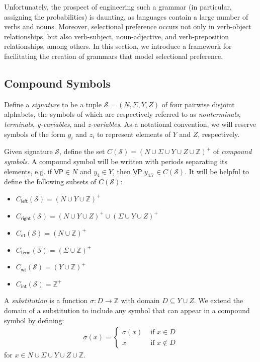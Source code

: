 \documentclass[11pt]{article}
\begin{document}
Unfortunately, the prospect of engineering such a grammar (in particular, assigning the probabilities) is daunting, as languages contain a large number of verbs and nouns. Moreover, selectional preference occurs not only in verb-object relationships, but also verb-subject, noun-adjective, and verb-preposition relationships, among others. In this section, we introduce a framework for facilitating the creation of grammars that model selectional preference.

\subsection{Compound Symbols}

Define a \emph{signature} to be a tuple $\mathcal{S} = (N, \Sigma, Y, Z)$ of four pairwise disjoint alphabets, the symbols of which are respectively referred to as \emph{nonterminals}, \emph{terminals}, \emph{y-variables}, and \emph{z-variables}. As a notational convention, we will reserve symbols of the form $y_i$ and $z_i$ to represent elements of $Y$ and $Z$, respectively.

Given signature $\mathcal{S}$, define the set $C(\mathcal{S}) = (N \cup \Sigma \cup Y \cup Z \cup \mathbb{Z})^+$ of \emph{compound symbols}. A compound symbol will be written with periods separating its elements, e.g. if $\mathsf{VP} \in N$ and $y_4 \in Y$, then $\mathsf{VP}.y_4.7 \in C(\mathcal{S})$. It will be helpful to define the following subsets of $C(\mathcal{S})$:
\begin{itemize}
	\item $C_{\mathsf{left}}(\mathcal{S}) = (N \cup Y \cup \mathbb{Z})^+$
	\item $C_{\mathsf{right}}(\mathcal{S}) = (N \cup Y \cup Z)^+ \cup (\Sigma \cup Y \cup Z)^+$
	\item $C_{\mathsf{nt}}(\mathcal{S}) = (N \cup \mathbb{Z})^+$
	\item $C_{\mathsf{term}}(\mathcal{S}) = (\Sigma \cup \mathbb{Z})^+$
	\item $C_{\mathsf{wt}}(\mathcal{S}) = (Y \cup \mathbb{Z})^+$
	\item $C_{\mathsf{int}}(\mathcal{S}) = \mathbb{Z}^+$
\end{itemize}

A \emph{substitution} is a function $\sigma: D \rightarrow \mathbb{Z}$ with domain $D \subseteq Y \cup Z$. We extend the domain of a substitution to include any symbol that can appear in a compound symbol by defining:
\begin{gather*}
\bar{\sigma}(x) = \begin{cases}
         \sigma(x) &\mbox{ if } x \in D\\
         x &\mbox{ if } x \not\in D
       \end{cases}
\end{gather*}
\noindent for $x \in N \cup \Sigma \cup Y \cup Z \cup \mathbb{Z}$.
\end{document}
